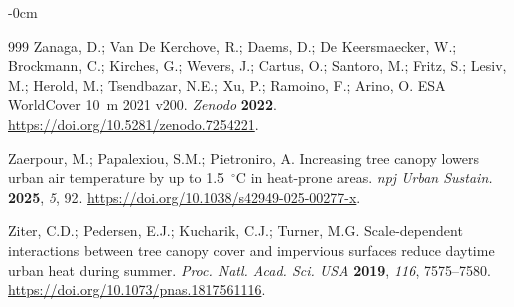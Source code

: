 \documentclass[remotesensing,article,submit,oneauthor]{Definitions/mdpi}
\begin{document}
\begin{adjustwidth}{-\extralength}{0cm}
{\begin{thebibliography}{999}
Zanaga, D.; Van De Kerchove, R.; Daems, D.; De Keersmaecker, W.;
Brockmann, C.; Kirches, G.; Wevers, J.; Cartus, O.; Santoro, M.;
Fritz, S.; Lesiv, M.; Herold, M.; Tsendbazar, N.E.; Xu, P.; Ramoino, F.;
Arino, O. ESA WorldCover 10~m 2021 v200. \textit{Zenodo} \textbf{2022}.
\url{https://doi.org/10.5281/zenodo.7254221}.

Zaerpour, M.; Papalexiou, S.M.; Pietroniro, A. Increasing tree canopy
lowers urban air temperature by up to 1.5~$^{\circ}$C in heat-prone areas.
\textit{npj Urban Sustain.} \textbf{2025}, \textit{5}, 92.
\url{https://doi.org/10.1038/s42949-025-00277-x}.

Ziter, C.D.; Pedersen, E.J.; Kucharik, C.J.; Turner, M.G. Scale-dependent
interactions between tree canopy cover and impervious surfaces reduce
daytime urban heat during summer. \textit{Proc. Natl. Acad. Sci. USA}
\textbf{2019}, \textit{116}, 7575--7580.
\url{https://doi.org/10.1073/pnas.1817561116}.

\end{thebibliography}
}

\PublishersNote{}
\end{adjustwidth}
\end{document}
